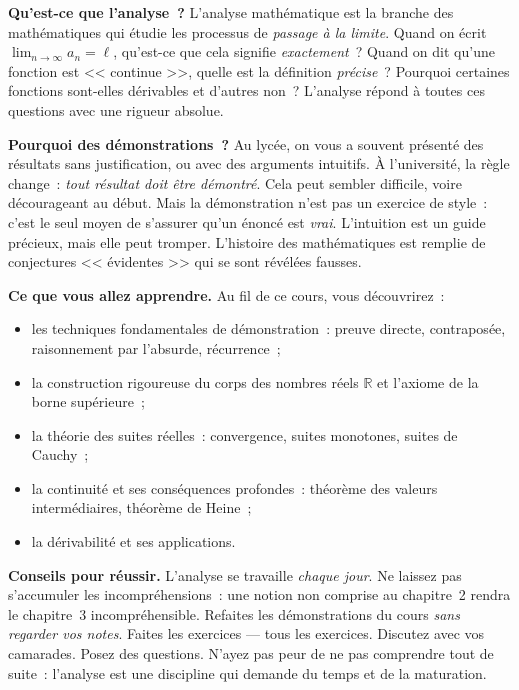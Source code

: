 \documentclass[12pt,a4paper,openany]{book}
\theoremstyle{definition}
\newcommand{\R}{\mathbb{R}}
\begin{document}
\medskip

\textbf{Qu'est-ce que l'analyse~?} L'analyse mathématique est la branche des mathématiques qui étudie les processus de \emph{passage à la limite}. Quand on écrit $\lim_{n\to\infty} a_n = \ell$, qu'est-ce que cela signifie \emph{exactement}~? Quand on dit qu'une fonction est << continue >>, quelle est la définition \emph{précise}~? Pourquoi certaines fonctions sont-elles dérivables et d'autres non~? L'analyse répond à toutes ces questions avec une rigueur absolue.

\medskip

\textbf{Pourquoi des démonstrations~?} Au lycée, on vous a souvent présenté des résultats sans justification, ou avec des arguments intuitifs. À l'université, la règle change~: \emph{tout résultat doit être démontré}. Cela peut sembler difficile, voire décourageant au début. Mais la démonstration n'est pas un exercice de style~: c'est le seul moyen de s'assurer qu'un énoncé est \emph{vrai}. L'intuition est un guide précieux, mais elle peut tromper. L'histoire des mathématiques est remplie de conjectures << évidentes >> qui se sont révélées fausses.

\medskip

\textbf{Ce que vous allez apprendre.} Au fil de ce cours, vous découvrirez~:
\begin{itemize}[leftmargin=2cm]
  \item les techniques fondamentales de démonstration~: preuve directe, contraposée, raisonnement par l'absurde, récurrence~;
  \item la construction rigoureuse du corps des nombres réels $\R$ et l'axiome de la borne supérieure~;
  \item la théorie des suites réelles~: convergence, suites monotones, suites de Cauchy~;
  \item la continuité et ses conséquences profondes~: théorème des valeurs intermédiaires, théorème de Heine~;
  \item la dérivabilité et ses applications.
\end{itemize}

\medskip

\textbf{Conseils pour réussir.} L'analyse se travaille \emph{chaque jour}. Ne laissez pas s'accumuler les incompréhensions~: une notion non comprise au chapitre~2 rendra le chapitre~3 incompréhensible. Refaites les démonstrations du cours \emph{sans regarder vos notes}. Faites les exercices --- tous les exercices. Discutez avec vos camarades. Posez des questions. N'ayez pas peur de ne pas comprendre tout de suite~: l'analyse est une discipline qui demande du temps et de la maturation.
\end{document}
